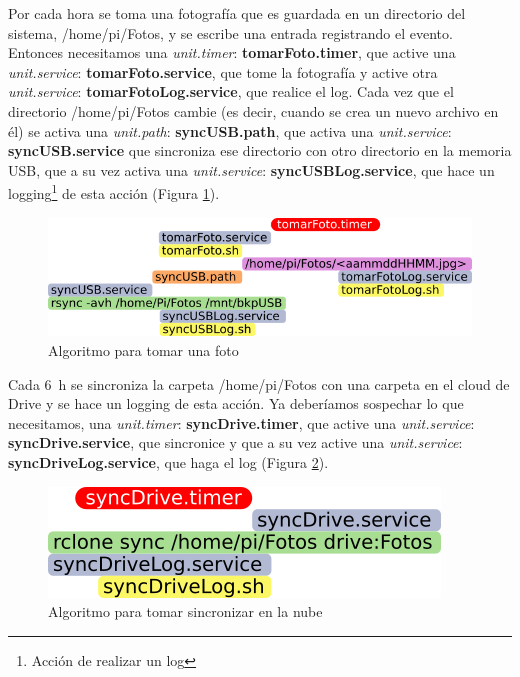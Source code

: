 \documentclass[10pt,a4paper]{article}
\begin{document}
Por cada hora se toma una fotograf\'ia que es guardada en un directorio del sistema, /home/pi/Fotos, y se escribe una entrada registrando el evento. Entonces necesitamos una \emph{unit.timer}: \textbf{tomarFoto.timer}, que active una \emph{unit.service}: \textbf{tomarFoto.service}, que tome la fotograf\'ia y active otra \emph{unit.service}: \textbf{tomarFotoLog.service}, que realice el log. Cada vez que el directorio /home/pi/Fotos cambie (es decir, cuando se crea un nuevo archivo en \'el) se activa una \emph{unit.path}: \textbf{syncUSB.path}, que activa una \emph{unit.service}: \textbf{syncUSB.service} que sincroniza ese directorio con otro directorio en la memoria USB, que a su vez activa una \emph{unit.service}: \textbf{syncUSBLog.service}, que hace un logging\footnote{Acci\'on de realizar un log} de esta acci\'on (Figura \ref{fig:tomarFoto}).\\

\begin{figure}[h!]
\centering
    \includegraphics[scale=0.25]{pictos/tomarFoto.png}
    \caption{Algoritmo para tomar una foto}
    \label{fig:tomarFoto}
\end{figure}

Cada \SI{6}{h} se sincroniza la carpeta /home/pi/Fotos con una carpeta en el cloud de Drive y se hace un logging de esta acci\'on. Ya deber\'iamos sospechar lo que necesitamos, una \emph{unit.timer}: \textbf{syncDrive.timer}, que active una \emph{unit.service}: \textbf{syncDrive.service}, que sincronice y que a su vez active una \emph{unit.service}: \textbf{syncDriveLog.service}, que haga el log (Figura \ref{fig:syncDrive}).\\

\begin{figure}[h!]
\centering
    \includegraphics[scale=0.25]{pictos/syncDriver.png}
    \caption{Algoritmo para tomar sincronizar en la nube}
    \label{fig:syncDrive}
\end{figure}
\end{document}
